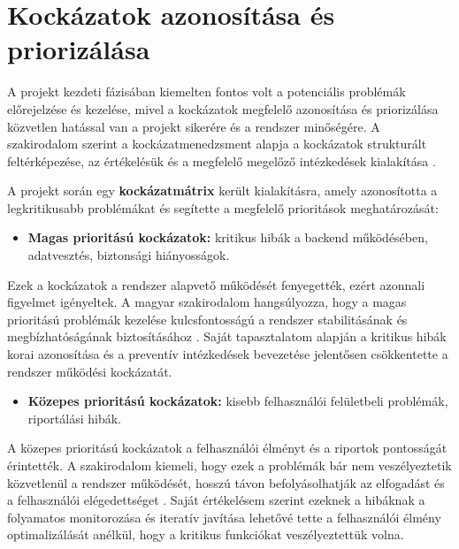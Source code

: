\section{Kockázatok azonosítása és priorizálása}

A projekt kezdeti fázisában kiemelten fontos volt a potenciális problémák előrejelzése és kezelése, 
mivel a kockázatok megfelelő azonosítása és priorizálása közvetlen hatással van a projekt sikerére 
és a rendszer minőségére. A szakirodalom szerint a kockázatmenedzsment alapja a kockázatok strukturált feltérképezése, 
az értékelésük és a megfelelő megelőző intézkedések kialakítása \cite{Hajdu2014,Szalay2018,Kovacs2016}.

A projekt során egy \textbf{kockázatmátrix} került kialakításra, amely azonosította a legkritikusabb problémákat és segítette a megfelelő prioritások meghatározását:

\begin{itemize}
    \item \textbf{Magas prioritású kockázatok:} kritikus hibák a backend működésében, adatvesztés, biztonsági hiányosságok.
\end{itemize}

Ezek a kockázatok a rendszer alapvető működését fenyegették, ezért azonnali figyelmet igényeltek. 
A magyar szakirodalom hangsúlyozza, hogy a magas prioritású problémák kezelése kulcsfontosságú a 
rendszer stabilitásának és megbízhatóságának biztosításához \cite{Kaposi2019,Szalay2018}. Saját tapasztalatom alapján a kritikus 
hibák korai azonosítása és a preventív intézkedések bevezetése jelentősen csökkentette a rendszer működési kockázatát.

\begin{itemize}
    \item \textbf{Közepes prioritású kockázatok:} kisebb felhasználói felületbeli problémák, riportálási hibák.
\end{itemize}

A közepes prioritású kockázatok a felhasználói élményt és a riportok pontosságát érintették. 
A szakirodalom kiemeli, hogy ezek a problémák bár nem veszélyeztetik közvetlenül a rendszer működését, 
hosszú távon befolyásolhatják az elfogadást és a felhasználói elégedettséget \cite{Hajdu2014,Kovacs2016}. 
Saját értékelésem szerint ezeknek a hibáknak a folyamatos monitorozása és iteratív javítása lehetővé tette 
a felhasználói élmény optimalizálását anélkül, hogy a kritikus funkciókat veszélyeztettük volna.

